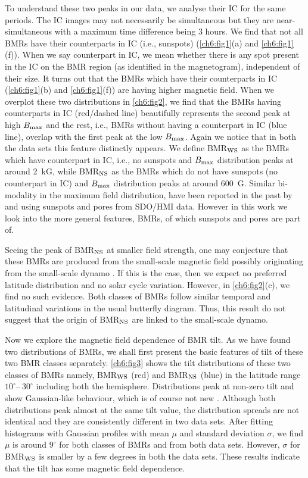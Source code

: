 To understand these two peaks in our data, we analyse their  IC for the same periods. The IC images may not necessarily be simultaneous but they are near-simultaneous with a maximum time difference being 3 hours.
We find that not all BMRs have their counterparts in IC (i.e., sunspots) (\autoref{ch6:fig1}(a) and \autoref{ch6:fig1}(f)). When we say counterpart in IC, we mean whether there is any spot present in the IC on the BMR region (as identified in the magnetogram), independent of their size. It turns out that the BMRs which have their counterparts in IC (\autoref{ch6:fig1}(b) and \autoref{ch6:fig1}(f)) are having higher magnetic field. When we overplot these two distributions in \autoref{ch6:fig2}, we find that the BMRs having counterparts in IC (red/dashed line) beautifully represents the second peak at high $B_{\rm max}$ and the rest, i.e., BMRs without having a counterpart in IC (blue line), 
overlap with the first peak at the low $B_{\rm max}$.
Again we notice that in both the data sets this feature distinctly appears.
We define BMR$_{\rm WS}$ as the BMRs which have counterpart in IC, i.e., no sunspots and $B_{\rm max}$ distribution peaks at around 2~kG, while
BMR$_{\rm NS}$ as the BMRs which do not have sunspots (no counterpart in IC) and $B_{\rm max}$ distribution peaks at around 600~G.
Similar bi-modality in the maximum field distribution, have been reported in the past by \citet{Cho2015} and \citet{Tlatov2019} using sunspots and pores from SDO/HMI data. However in this work we look into the more general features, BMRs, of which sunspots and pores are part of.

Seeing the peak of BMR$_{\rm NS}$ at smaller field strength, one may conjecture that these
BMRs are produced from the small-scale magnetic field possibly originating  from the small-scale
dynamo \citep{Petrovay1993}. If this is the case, then we expect no preferred latitude distribution and no solar 
cycle variation. 
However, in \autoref{ch6:fig2}(c), we find no such evidence. Both classes of BMRs
follow similar temporal and latitudinal variations in the usual butterfly diagram. Thus, this 
result do not suggest that the origin of BMR$_{\rm NS}$ are linked to the small-scale dynamo.



Now we explore the magnetic field dependence of BMR tilt. 
As we have found two distributions of BMRs, we shall first 
present the basic features of tilt of these two BMR classes separately. 
\autoref{ch6:fig3} shows the tilt distributions of these two classes of BMRs namely, BMR$_{\rm WS}$ (red) and BMR$_{\rm NS}$ (blue) in the latitude range $10^\circ$--$~30^\circ$ including both the hemisphere.
Distributions peak at non-zero tilt and show Gaussian-like behaviour, which is of course not new \citep{Wang1989, Stenflo2012a}. 
Although both distributions peak almost at the same tilt value, the distribution spreads are not identical 
and they are consistently different in two data sets. 
After fitting histograms with Gaussian profiles with mean $\mu$ and standard deviation $\sigma$, we find 
$\mu$ is around $9^{\circ}$ for both classes of BMRs and from both data sets. 
However, $\sigma$ for BMR$_{\rm WS}$ is smaller by a few degrees in both the data sets.
These results indicate that the tilt has some magnetic field dependence.

